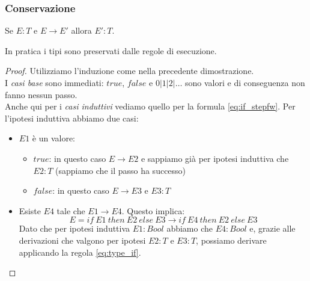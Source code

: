 \subsubsection{Conservazione}
\begin{definition}[Conservazione]
	Se $E:T$ e $E \rightarrow E'$ allora $E':T$.
\end{definition}
In pratica i tipi sono preservati dalle regole di esecuzione.
\begin{proof}
	Utilizziamo l'induzione come nella precedente dimostrazione.\\
	I \textit{casi base} sono immediati: $true$, $false$ e $0 \vert 1 \vert 2 \vert \ldots$ sono valori e di conseguenza non fanno nessun passo. \\
	Anche qui per i \textit{casi induttivi} vediamo quello per la formula \ref{eq:if_stepfw}. Per l'ipotesi induttiva abbiamo due casi:
	\begin{itemize}
		\item $E1$ è un valore: \begin{itemize}
			\item $true$: in questo caso $E \rightarrow E2$ e sappiamo già per ipotesi induttiva che $E2:T$ (sappiamo che il passo ha successo)
			\item $false$: in questo caso $E \rightarrow E3$ e $E3:T$
		\end{itemize}
		\item Esiste $E4$ tale che $E1 \rightarrow E4$. Questo implica:
		\begin{equation*}
			E = if \: E1 \: then \: E2 \: else \: E3 \rightarrow if \: E4 \: then \: E2 \: else \: E3
		\end{equation*}
		Dato che per ipotesi induttiva $E1:Bool$ abbiamo che $E4:Bool$ e, grazie alle derivazioni che valgono per ipotesi $E2:T$ e $E3:T$, possiamo derivare applicando la regola \ref{eq:type_if}.
	\end{itemize}
\end{proof}
